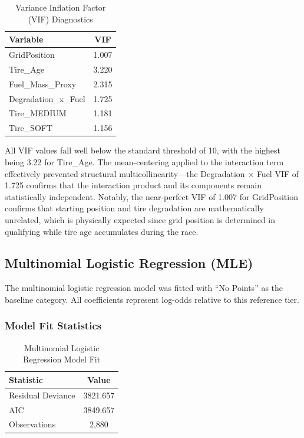 \begin{table}[htbp]
  \centering
  \caption{Variance Inflation Factor (VIF) Diagnostics}
  \label{tab:vif}
  \begin{tabular}{lc}
    \toprule
    \textbf{Variable} & \textbf{VIF} \\
    \midrule
    GridPosition       & 1.007 \\
    Tire\_Age          & 3.220 \\
    Fuel\_Mass\_Proxy  & 2.315 \\
    Degradation\_x\_Fuel & 1.725 \\
    Tire\_MEDIUM       & 1.181 \\
    Tire\_SOFT         & 1.156 \\
    \bottomrule
  \end{tabular}
\end{table}

All VIF values fall well below the standard threshold of 10, with the highest
being 3.22 for Tire\_Age. The mean-centering applied to the interaction term
effectively prevented structural multicollinearity---the Degradation $\times$
Fuel VIF of 1.725 confirms that the interaction product and its components
remain statistically independent. Notably, the near-perfect VIF of 1.007 for
GridPosition confirms that starting position and tire degradation are
mathematically unrelated, which is physically expected since grid position is
determined in qualifying while tire age accumulates during the race.

\subsection{Multinomial Logistic Regression (MLE)}

The multinomial logistic regression model was fitted with ``No Points'' as the
baseline category. All coefficients represent log-odds relative to this
reference tier.

\subsubsection{Model Fit Statistics}

\begin{table}[htbp]
  \centering
  \caption{Multinomial Logistic Regression Model Fit}
  \label{tab:model-fit}
  \begin{tabular}{lc}
    \toprule
    \textbf{Statistic} & \textbf{Value} \\
    \midrule
    Residual Deviance & 3821.657 \\
    AIC               & 3849.657 \\
    Observations      & 2,880 \\
    \bottomrule
  \end{tabular}
\end{table}

